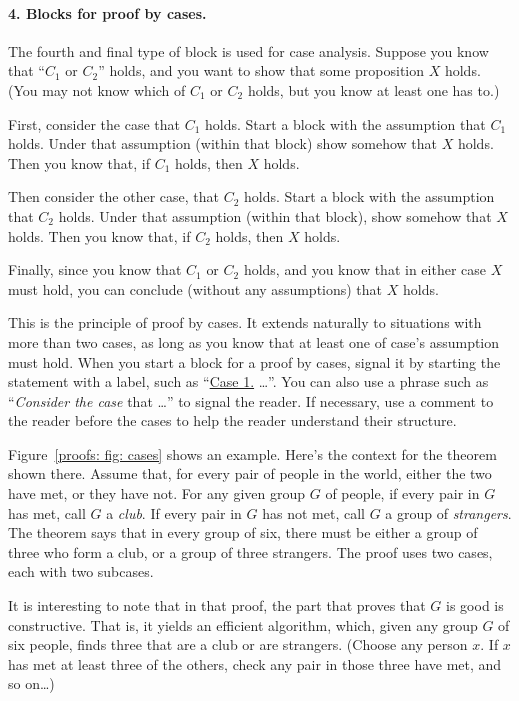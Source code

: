\paragraph{4. Blocks for proof by cases.}
The fourth and final type of block is used for case analysis.
Suppose you know that
``\emph{$C_1 \text{ or } C_2$}'' holds,
and you want to show that some proposition $X$ holds.
(You may not know which of $C_1$ or $C_2$ holds,
but you know at least one has to.)

First, consider the case that $C_1$ holds.
Start a block with the assumption that $C_1$ holds.
Under that assumption (within that block) show somehow that $X$ holds.
Then you know that, if $C_1$ holds, then $X$ holds.

Then consider the other case, that $C_2$ holds.
Start a block with the assumption that $C_2$ holds.
Under that assumption (within that block), show somehow that $X$ holds.
Then you know that, if $C_2$ holds, then $X$ holds.

Finally, since you know that $C_1 \text{ or } C_2$ holds,
and you know that in either case $X$ must hold,
you can conclude (without any assumptions) that $X$ holds.

This is the principle of proof by cases.
It extends naturally to situations with more than two cases,
as long as you know that at least one of case's assumption must hold.
%
When you start a block for a proof by cases,
signal it by starting the statement with a label, such as ``\underline{Case 1.} \ldots''.
You can also use a phrase such as ``\emph{Consider the case} that \ldots'' to signal the reader.
If necessary, use a comment to the reader before the cases
to help the reader understand their structure.

Figure~\ref{proofs: fig: cases} shows an example.
Here's the context for the theorem shown there.
Assume that, for every pair of people in the world, either the two have met, or they have not.
For any given group $G$ of people,
if every pair in $G$ has met, call $G$ a \emph{club}.
If every pair in $G$ has not met, call $G$ a group of \emph{strangers}.
The theorem says that in every group of six,
there must be either a group of three who form a club,
or a group of three strangers.
The proof uses two cases, each with two subcases.

It is interesting to note that in that proof,
the part that proves that $G$ is good is constructive.
That is, it yields an efficient algorithm, which, given any group $G$ of six people,
finds three that are a club or are strangers.
(Choose any person $x$.  If $x$ has met at least three of the others,
check any pair in those three have met, and so on\ldots)

